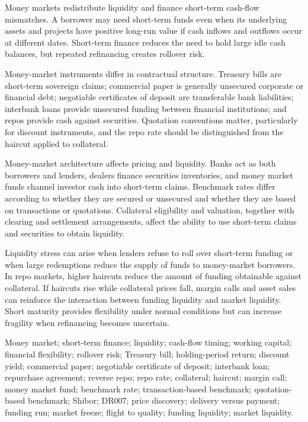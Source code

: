 
Money markets redistribute liquidity and finance short-term cash-flow mismatches. A borrower may need short-term funds even when its underlying assets and projects have positive long-run value if cash inflows and outflows occur at different dates. Short-term finance reduces the need to hold large idle cash balances, but repeated refinancing creates rollover risk.

Money-market instruments differ in contractual structure. Treasury bills are short-term sovereign claims; commercial paper is generally unsecured corporate or financial debt; negotiable certificates of deposit are transferable bank liabilities; interbank loans provide unsecured funding between financial institutions; and repos provide cash against securities. Quotation conventions matter, particularly for discount instruments, and the repo rate should be distinguished from the haircut applied to collateral.

Money-market architecture affects pricing and liquidity. Banks act as both borrowers and lenders, dealers finance securities inventories, and money market funds channel investor cash into short-term claims. Benchmark rates differ according to whether they are secured or unsecured and whether they are based on transactions or quotations. Collateral eligibility and valuation, together with clearing and settlement arrangements, affect the ability to use short-term claims and securities to obtain liquidity.

Liquidity stress can arise when lenders refuse to roll over short-term funding or when large redemptions reduce the supply of funds to money-market borrowers. In repo markets, higher haircuts reduce the amount of funding obtainable against collateral. If haircuts rise while collateral prices fall, margin calls and asset sales can reinforce the interaction between funding liquidity and market liquidity. Short maturity provides flexibility under normal conditions but can increase fragility when refinancing becomes uncertain.



Money market; short-term finance; liquidity; cash-flow timing; working capital; financial flexibility; rollover risk; Treasury bill; holding-period return; discount yield; commercial paper; negotiable certificate of deposit; interbank loan; repurchase agreement; reverse repo; repo rate; collateral; haircut; margin call; money market fund; benchmark rate; transaction-based benchmark; quotation-based benchmark; Shibor; DR007; price discovery; delivery versus payment; funding run; market freeze; flight to quality; funding liquidity; market liquidity.

